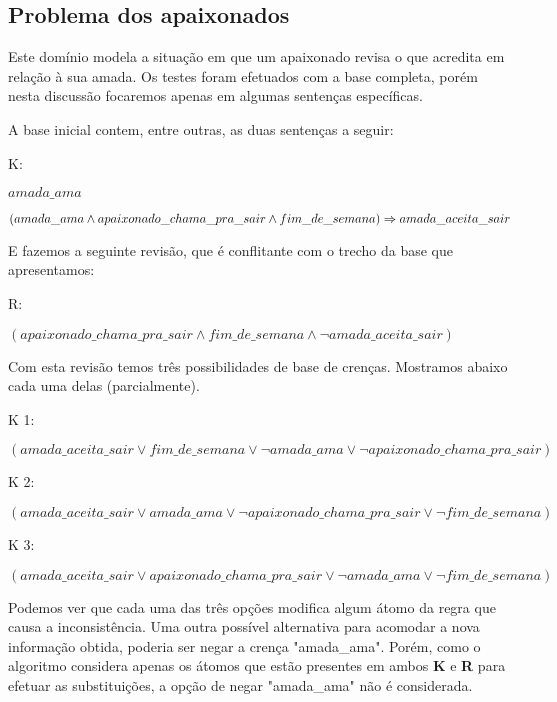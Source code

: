 \documentclass[10pt,a4paper]{amsart}
\begin{document}
\subsection{Problema dos apaixonados}
Este domínio modela a situação em que um apaixonado revisa o que acredita em relação à sua amada. Os testes foram efetuados com a base completa, porém nesta discussão focaremos apenas em algumas sentenças específicas.

A base inicial contem, entre outras, as duas sentenças a seguir:
\begin{framed}
K:

$amada\_ama$

$(amada\_ama \land apaixonado\_chama\_pra\_sair \land fim\_de\_semana)
\\ \Rightarrow amada\_aceita\_sair$
\end{framed}

E fazemos a seguinte revisão, que é conflitante com o trecho da base que apresentamos:
\begin{framed}
R:

$(apaixonado\_chama\_pra\_sair \land fim\_de\_semana \land \neg amada\_aceita\_sair)$
\end{framed}

Com esta revisão temos três possibilidades de base de crenças. Mostramos abaixo cada uma delas (parcialmente).
\begin{framed}
K 1:

$(amada\_aceita\_sair \lor fim\_de\_semana \lor \neg amada\_ama \lor \neg apaixonado\_chama\_pra\_sair)$

K 2:

$(amada\_aceita\_sair \lor amada\_ama \lor \neg apaixonado\_chama\_pra\_sair \lor \neg fim\_de\_semana)$

K 3:

$(amada\_aceita\_sair \lor apaixonado\_chama\_pra\_sair \lor \neg amada\_ama \lor \neg fim\_de\_semana)$
 
\end{framed}

Podemos ver que cada uma das três opções modifica algum átomo da regra que causa a inconsistência.
Uma outra possível alternativa para acomodar a nova informação obtida, poderia ser negar a crença "amada\_ama". Porém, como o algoritmo considera apenas os átomos que estão presentes em ambos \textbf{K} e \textbf{R} para efetuar as substituições, a opção de negar "amada\_ama" não é considerada.




\end{document}
